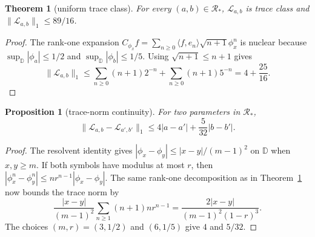 \documentclass[11pt]{article}
\newtheorem{theorem}{Theorem}
\newtheorem{proposition}{Proposition}
\newcommand{\D}{\mathbb D}
\newcommand{\Lop}{\mathcal L}
\begin{document}
\begin{theorem}[uniform trace class]\label{thm:nuclear}
For every $(a,b)\in\mathcal R_*$, $\Lop_{a,b}$ is trace class and
$\|\Lop_{a,b}\|_1\le89/16$.
\end{theorem}
\begin{proof}
The rank-one expansion
$C_{\phi_x}f=\sum_{n\ge0}\langle f,e_n\rangle\sqrt{n+1}\phi_x^n$
is nuclear because $\sup_{\D}|\phi_a|\le1/2$ and
$\sup_{\D}|\phi_b|\le1/5$.  Using $\sqrt{n+1}\le n+1$ gives
\[
 \|\Lop_{a,b}\|_1\le\sum_{n\ge0}(n+1)2^{-n}
 +\sum_{n\ge0}(n+1)5^{-n}=4+\frac{25}{16}.
\]
\end{proof}

\begin{proposition}[trace-norm continuity]\label{prop:lip}
For two parameters in $\mathcal R_*$,
\[
 \|\Lop_{a,b}-\Lop_{a',b'}\|_1
 \le4|a-a'|+\frac5{32}|b-b'|.
\]
\end{proposition}
\begin{proof}
The resolvent identity gives
$|\phi_x-\phi_y|\le|x-y|/(m-1)^2$ on $\D$ when $x,y\ge m$.
If both symbols have modulus at most $r$, then
$|\phi_x^n-\phi_y^n|\le nr^{n-1}|\phi_x-\phi_y|$.  The same rank-one
decomposition as in Theorem~\ref{thm:nuclear} now bounds the trace norm by
\[
 \frac{|x-y|}{(m-1)^2}
 \sum_{n\ge1}(n+1)nr^{n-1}
 =\frac{2|x-y|}{(m-1)^2(1-r)^3}.
\]
The choices $(m,r)=(3,1/2)$ and $(6,1/5)$ give $4$ and $5/32$.
\end{proof}
\end{document}
